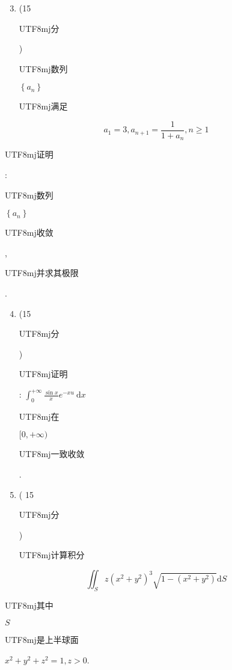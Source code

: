 \documentclass[10pt]{article}
\begin{document}
\begin{enumerate}
  \setcounter{enumi}{2}
  \item (15 \begin{CJK}{UTF8}{mj}分\end{CJK}) \begin{CJK}{UTF8}{mj}数列\end{CJK} $\left\{a_{n}\right\}$ \begin{CJK}{UTF8}{mj}满足\end{CJK}
\end{enumerate}
$$
a_{1}=3, a_{n+1}=\frac{1}{1+a_{n}}, n \geqslant 1
$$
\begin{CJK}{UTF8}{mj}证明\end{CJK}: \begin{CJK}{UTF8}{mj}数列\end{CJK} $\left\{a_{n}\right\}$ \begin{CJK}{UTF8}{mj}收敛\end{CJK}, \begin{CJK}{UTF8}{mj}并求其极限\end{CJK}.

\begin{enumerate}
  \setcounter{enumi}{3}
  \item (15 \begin{CJK}{UTF8}{mj}分\end{CJK}) \begin{CJK}{UTF8}{mj}证明\end{CJK}: $\int_{0}^{+\infty} \frac{\sin x}{x} e^{-x u} \mathrm{~d} x$ \begin{CJK}{UTF8}{mj}在\end{CJK} $[0,+\infty)$ \begin{CJK}{UTF8}{mj}一致收敛\end{CJK}.

  \item ( 15 \begin{CJK}{UTF8}{mj}分\end{CJK}) \begin{CJK}{UTF8}{mj}计算积分\end{CJK}

\end{enumerate}
$$
\iint_{S} z\left(x^{2}+y^{2}\right)^{3} \sqrt{1-\left(x^{2}+y^{2}\right)} \mathrm{d} S
$$
\begin{CJK}{UTF8}{mj}其中\end{CJK} $S$ \begin{CJK}{UTF8}{mj}是上半球面\end{CJK} $x^{2}+y^{2}+z^{2}=1, z>0$.
\end{document}
